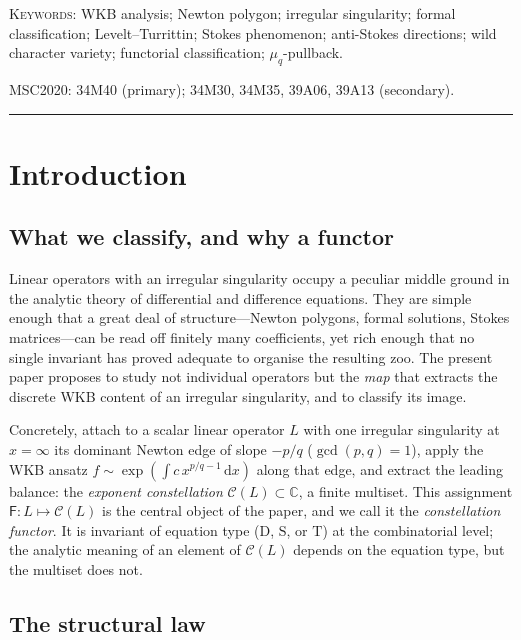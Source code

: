 \documentclass[11pt,a4paper]{article}
\theoremstyle{plain}
\theoremstyle{definition}
\theoremstyle{remark}
\newcommand{\opD}{\mathrm{D}}                     %
\newcommand{\opS}{\mathrm{S}}                     %
\newcommand{\opT}{\mathrm{T}}                     %
\newcommand{\Cl}{\mathcal{C}}
\newcommand{\Fclass}{\mathsf{F}}
\begin{document}
\bigskip
\noindent\textsc{Keywords:} WKB analysis; Newton polygon; irregular
singularity; formal classification; Levelt--Turrittin; Stokes phenomenon;
anti-Stokes directions; wild character variety; functorial classification;
$\mu_q$-pullback.

\bigskip
\noindent\textsc{MSC2020:} 34M40 (primary); 34M30, 34M35, 39A06, 39A13
(secondary).

\tableofcontents

\bigskip\hrule\bigskip


\section{Introduction}\label{sec:intro}

\subsection{What we classify, and why a functor}\label{ssec:intro-functor}

Linear operators with an irregular singularity occupy a peculiar middle
ground in the analytic theory of differential and difference equations. They
are simple enough that a great deal of structure---Newton polygons, formal
solutions, Stokes matrices---can be read off finitely many coefficients,
yet rich enough that no single invariant has proved adequate to organise
the resulting zoo. The present paper proposes to study not individual
operators but the \emph{map} that extracts the discrete WKB content of an
irregular singularity, and to classify its image.

Concretely, attach to a scalar linear operator $L$ with one irregular
singularity at $x = \infty$ its dominant Newton edge of slope $-p/q$
($\gcd(p, q) = 1$), apply the WKB ansatz $f \sim \exp(\int c\, x^{p/q-1}\,
\mathrm{d}x)$ along that edge, and extract the leading balance: the
\emph{exponent constellation}
$\Cl(L) \subset \mathbb{C}$, a finite multiset. This assignment
$\Fclass \colon L \mapsto \Cl(L)$ is the central object of the paper, and
we call it the \emph{constellation functor}. It is invariant of equation
type ($\opD$, $\opS$, or $\opT$) at the combinatorial level; the analytic
meaning of an element of $\Cl(L)$ depends on the equation type, but the
multiset does not.

\subsection{The structural law}\label{ssec:intro-law}
\end{document}
